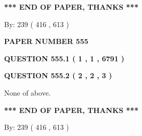 \documentclass[12pt]{article}
\begin{document}
 
 
 
   
   
 \vspace{0.2in}
 
   
   
   
   
\vspace{1.0in} 
{\textbf{\large{ *** END OF PAPER, THANKS *** }}} 
   
   
\hspace{1.0in} By: 
 239 ( 416 ,  613 )
   
   
   
   
\newpage 
\setcounter{page}{ 
   555001 } 
   
   
   
   
 {\textbf{ \Large{ PAPER NUMBER  555  }}}
   
   
\vspace{0.2in}
   
   
   
   
   
   
 \vspace{0.2in}
 
 
 
 
   
   
  
\vspace{0.2in}
  
{\textbf{\Large{QUESTION
555.1 
 ( 1 , 1 , 6791 )
}}}
  
  
  
\vspace{0.2in}
  
{\textbf{\Large{QUESTION
555.2 
 ( 2 , 2 , 3 )
}}}
  
  
 
 
\noindent{}
 
 
 None of above.
 
 
 
 
   
   
 \vspace{0.2in}
 
   
   
   
   
\vspace{1.0in} 
{\textbf{\large{ *** END OF PAPER, THANKS *** }}} 
   
   
\hspace{1.0in} By: 
 239 ( 416 ,  613 )
   
\end{document}
